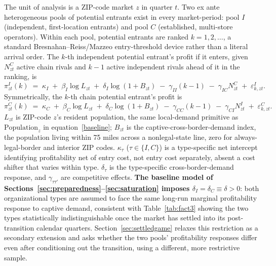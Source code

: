 \documentclass[english,12pt]{article}
\begin{document}
The unit of analysis is a ZIP-code market $z$ in quarter $t$. Two ex ante heterogeneous pools of potential entrants exist in every market-period: pool $I$ (independent, first-location entrants) and pool $C$ (established, multi-store operators). Within each pool, potential entrants are ranked $k=1,2,\dots$, a standard Bresnahan--Reiss/Mazzeo entry-threshold device rather than a literal arrival order. The $k$-th independent potential entrant's profit if it enters, given $N^C_{zt}$ active chain rivals and $k-1$ active independent rivals ahead of it in the ranking, is
\begin{equation}
\pi^I_{zt}(k) \;=\; \kappa_I \;+\; \beta_I \log L_{zt} \;+\; \delta_I \log(1+B_{zt}) \;-\; \gamma_{II}(k-1) \;-\; \gamma_{IC} N^C_{zt} \;+\; \varepsilon^I_{k,zt}. \label{eq:piI}
\end{equation}
Symmetrically, the $k$-th chain potential entrant's profit is
\[
\pi^C_{zt}(k) \;=\; \kappa_C \;+\; \beta_C \log L_{zt} \;+\; \delta_C \log(1+B_{zt}) \;-\; \gamma_{CC}(k-1) \;-\; \gamma_{CI} N^I_{zt} \;+\; \varepsilon^C_{k,zt}.
\]
$L_{zt}$ is ZIP-code $z$'s resident population, the same local-demand primitive as $\text{Population}_z$ in equation~\eqref{baseline}; $B_{zt}$ is the captive-cross-border-demand index, the population living within 75 miles across a nonlegal-state line, zero for always-legal-border and interior ZIP codes. $\kappa_\tau$ ($\tau\in\{I,C\}$) is a type-specific net intercept identifying profitability net of entry cost, not entry cost separately, absent a cost shifter that varies within type. $\delta_\tau$ is the type-specific cross-border-demand response, and $\gamma_{\tau\tau'}$ are competitive effects. \textbf{The baseline model of Sections~\ref{sec:preparedness}--\ref{sec:saturation} imposes $\delta_I=\delta_C\equiv\delta>0$}: both organizational types are assumed to face the same long-run marginal profitability response to captive demand, consistent with Table~\ref{tab:fact3} showing the two types statistically indistinguishable once the market has settled into its post-transition calendar quarters. Section~\ref{sec:settledgame} relaxes this restriction as a secondary extension and asks whether the two pools' profitability responses differ even after conditioning out the transition, using a different, more restrictive sample.
\end{document}
